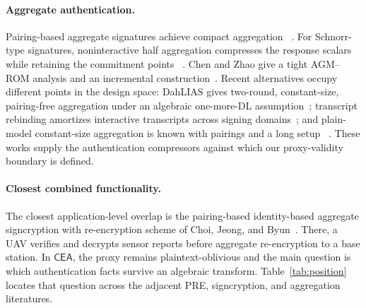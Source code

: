 \documentclass[11pt,letterpaper]{article}
\theoremstyle{definition}
\theoremstyle{remark}
\newcommand{\CEA}{\ensuremath{\mathsf{CEA}}\xspace}
\begin{document}
\paragraph{Aggregate authentication.}
Pairing-based aggregate signatures achieve compact aggregation
~\cite{BGLS03}.  For Schnorr-type signatures, noninteractive half aggregation
compresses the response scalars while retaining the commitment points
~\cite{CGKN21}.  Chen and Zhao give a tight AGM--ROM analysis and an incremental
construction~\cite{CZ22}.  Recent alternatives occupy different points in the
design space: DahLIAS gives two-round, constant-size, pairing-free aggregation
under an algebraic one-more-DL assumption~\cite{NRS26}; transcript rebinding
amortizes interactive transcripts across signing domains~\cite{ZWL26}; and
plain-model constant-size aggregation is known with pairings and a long setup
~\cite{HWW25}.  These works supply the authentication compressors against which
our proxy-validity boundary is defined.

\paragraph{Closest combined functionality.}
The closest application-level overlap is the pairing-based identity-based
aggregate signcryption with re-encryption scheme of Choi, Jeong, and
Byun~\cite{CJB26}.  There, a UAV verifies and decrypts sensor reports before
aggregate re-encryption to a base station.  In \CEA, the proxy remains
plaintext-oblivious and the main question is which authentication facts survive
an algebraic transform.  Table~\ref{tab:position} locates that question across
the adjacent PRE, signcryption, and aggregation literatures.
\end{document}
